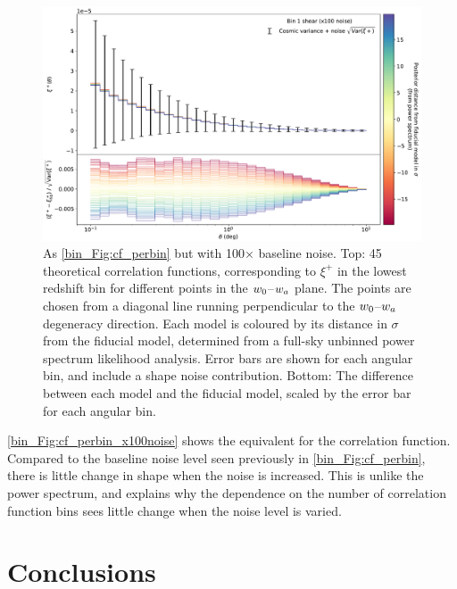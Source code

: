 \begin{figure}[tp]
\includegraphics[width=\textwidth]{cf_perbin_x100noise}
\caption{As \autoref{bin_Fig:cf_perbin} but with 100$\times$ baseline noise. Top: 45 theoretical correlation functions, corresponding to $\xi^+$ in the lowest redshift bin for different points in the $w_0$--$w_a$ plane. The points are chosen from a diagonal line running perpendicular to the $w_0$--$w_a$ degeneracy direction. Each model is coloured by its distance in $\sigma$ from the fiducial model, determined from a full-sky unbinned power spectrum likelihood analysis. Error bars are shown for each angular bin, and include a shape noise contribution. Bottom: The difference between each model and the fiducial model, scaled by the error bar for each angular bin.}
\label{bin_Fig:cf_perbin_x100noise}
\end{figure}

\autoref{bin_Fig:cf_perbin_x100noise} shows the equivalent for the correlation function. Compared to the baseline noise level seen previously in \autoref{bin_Fig:cf_perbin}, there is little change in shape when the noise is increased. This is unlike the power spectrum, and explains why the dependence on the number of correlation function bins sees little change when the noise level is varied.

\section{Conclusions}
\label{bin_sec:conclusions}


